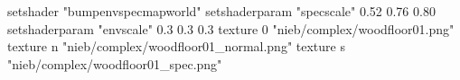 setshader "bumpenvspecmapworld"
setshaderparam "specscale" 0.52 0.76 0.80
setshaderparam "envscale"  0.3 0.3 0.3
    texture 0 "nieb/complex/woodfloor01.png"
    texture n "nieb/complex/woodfloor01_normal.png"
    texture s "nieb/complex/woodfloor01_spec.png"